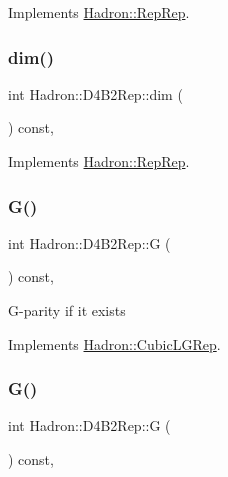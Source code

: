 Implements \mbox{\hyperlink{structHadron_1_1RepRep_a92c8802e5ed7afd7da43ccfd5b7cd92b}{Hadron\+::\+Rep\+Rep}}.

\mbox{\label{structHadron_1_1D4B2Rep_a0a06eb2f05e5c89bb898a325aeff1793}} 
\subsubsection{\texorpdfstring{dim()}{dim()}\hspace{0.1cm}{\footnotesize\ttfamily [3/3]}}
{\footnotesize\ttfamily int Hadron\+::\+D4\+B2\+Rep\+::dim (\begin{DoxyParamCaption}{ }\end{DoxyParamCaption}) const\hspace{0.3cm}{\ttfamily [inline]}, {\ttfamily [virtual]}}



Implements \mbox{\hyperlink{structHadron_1_1RepRep_a92c8802e5ed7afd7da43ccfd5b7cd92b}{Hadron\+::\+Rep\+Rep}}.

\mbox{\label{structHadron_1_1D4B2Rep_a2e5344a605913f47e790ac0c97017024}} 
\subsubsection{\texorpdfstring{G()}{G()}\hspace{0.1cm}{\footnotesize\ttfamily [1/2]}}
{\footnotesize\ttfamily int Hadron\+::\+D4\+B2\+Rep\+::G (\begin{DoxyParamCaption}{ }\end{DoxyParamCaption}) const\hspace{0.3cm}{\ttfamily [inline]}, {\ttfamily [virtual]}}

G-\/parity if it exists 

Implements \mbox{\hyperlink{structHadron_1_1CubicLGRep_ace26f7b2d55e3a668a14cb9026da5231}{Hadron\+::\+Cubic\+L\+G\+Rep}}.

\mbox{\label{structHadron_1_1D4B2Rep_a2e5344a605913f47e790ac0c97017024}} 
\subsubsection{\texorpdfstring{G()}{G()}\hspace{0.1cm}{\footnotesize\ttfamily [2/2]}}
{\footnotesize\ttfamily int Hadron\+::\+D4\+B2\+Rep\+::G (\begin{DoxyParamCaption}{ }\end{DoxyParamCaption}) const\hspace{0.3cm}{\ttfamily [inline]}, {\ttfamily [virtual]}}

